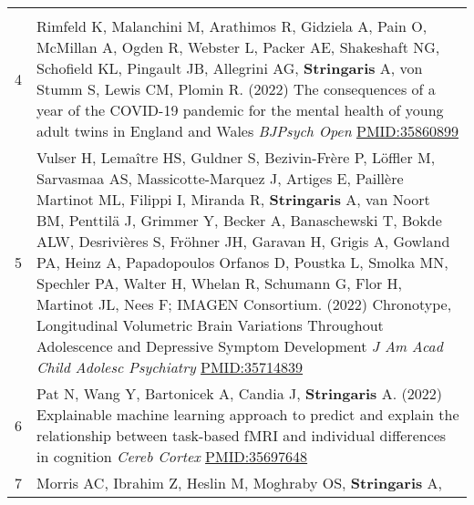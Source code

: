 \documentclass[
]{article}
\begin{document}
\begin{longtable}[]{@{}ll@{}}
\begin{minipage}[t]{0.94\columnwidth}
\end{minipage}\tabularnewline
\begin{minipage}[t]{0.01\columnwidth}\raggedright
4\strut
\end{minipage} & \begin{minipage}[t]{0.94\columnwidth}\raggedright
Rimfeld K, Malanchini M, Arathimos R, Gidziela A, Pain O, McMillan A,
Ogden R, Webster L, Packer AE, Shakeshaft NG, Schofield KL, Pingault JB,
Allegrini AG, \textbf{Stringaris} A, von Stumm S, Lewis CM, Plomin R.
(2022) The consequences of a year of the COVID-19 pandemic for the
mental health of young adult twins in England and Wales \emph{BJPsych
Open} \url{PMID:35860899}\strut
\end{minipage}\tabularnewline
\begin{minipage}[t]{0.01\columnwidth}\raggedright
5\strut
\end{minipage} & \begin{minipage}[t]{0.94\columnwidth}\raggedright
Vulser H, Lemaître HS, Guldner S, Bezivin-Frère P, Löffler M, Sarvasmaa
AS, Massicotte-Marquez J, Artiges E, Paillère Martinot ML, Filippi I,
Miranda R, \textbf{Stringaris} A, van Noort BM, Penttilä J, Grimmer Y,
Becker A, Banaschewski T, Bokde ALW, Desrivières S, Fröhner JH, Garavan
H, Grigis A, Gowland PA, Heinz A, Papadopoulos Orfanos D, Poustka L,
Smolka MN, Spechler PA, Walter H, Whelan R, Schumann G, Flor H, Martinot
JL, Nees F; IMAGEN Consortium. (2022) Chronotype, Longitudinal
Volumetric Brain Variations Throughout Adolescence and Depressive
Symptom Development \emph{J Am Acad Child Adolesc Psychiatry}
\url{PMID:35714839}\strut
\end{minipage}\tabularnewline
\begin{minipage}[t]{0.01\columnwidth}\raggedright
6\strut
\end{minipage} & \begin{minipage}[t]{0.94\columnwidth}\raggedright
Pat N, Wang Y, Bartonicek A, Candia J, \textbf{Stringaris} A. (2022)
Explainable machine learning approach to predict and explain the
relationship between task-based fMRI and individual differences in
cognition \emph{Cereb Cortex} \url{PMID:35697648}\strut
\end{minipage}\tabularnewline
\begin{minipage}[t]{0.01\columnwidth}\raggedright
7\strut
\end{minipage} & \begin{minipage}[t]{0.94\columnwidth}\raggedright
Morris AC, Ibrahim Z, Heslin M, Moghraby OS, \textbf{Stringaris} A,

\end{minipage}
\end{longtable}
\end{document}
